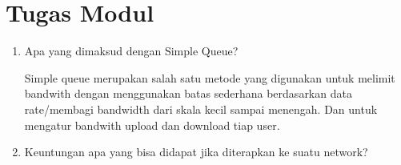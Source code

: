 \section*{Tugas Modul} %
\begin{enumerate}
    \item Apa yang dimaksud dengan Simple Queue?
    
        Simple queue merupakan salah satu metode yang digunakan untuk melimit bandwith dengan menggunakan batas sederhana berdasarkan data rate/membagi bandwidth dari skala kecil sampai menengah. Dan untuk mengatur bandwith upload dan download tiap user.
    
    \item Keuntungan apa yang bisa didapat jika diterapkan ke suatu network?
 
        
\end{enumerate}